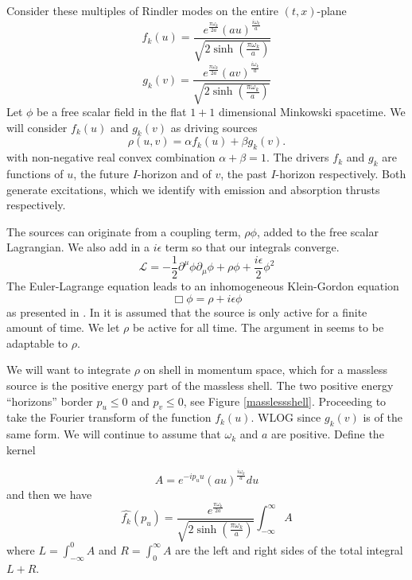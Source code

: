 \documentclass[12pt,a4paper]{article}
\begin{document}
Consider these multiples of Rindler modes on the entire $(t,x)$-plane
\begin{equation}
f_k(u) = \frac{e^{\frac{\pi \omega_k}{2a}} {(au)}^{\frac{i\omega_k}{a}}}{ \sqrt{2\sinh\left(\frac{\pi\omega_k}{a}\right)}}
\end{equation}
\begin{equation}
g_k(v) = \frac{e^{\frac{\pi \omega_k}{2a}} {(av)}^{\frac{i\omega_k}{a}}}{ \sqrt{2\sinh\left(\frac{\pi\omega_k}{a}\right)} }
\end{equation}
Let $\phi$ be a free scalar field in the flat $1+1$ dimensional Minkowski spacetime.  We will consider $f_k(u)$ and $g_k(v)$ as driving sources
\begin{equation}
\label{ab}
\rho(u,v) = \alpha f_k(u) + \beta g_k(v).
\end{equation}
with non-negative real convex combination $\alpha + \beta = 1$. The drivers $f_k$ and $g_k$ are functions of $u$, the future $I$-horizon and of $v$, the past $I$-horizon respectively.  Both generate excitations, which we identify with emission and absorption thrusts respectively.


The sources can originate from a coupling term, $\rho \phi$, added to the free scalar Lagrangian.  We also add in a $i \epsilon$ term so that our integrals converge.
\begin{equation}
\mathscr{L} = -\frac{1}{2} \partial^\mu \phi \partial_\mu \phi + \rho\phi + \frac{i \epsilon}{2}  \phi^2
\end{equation}
The Euler-Lagrange equation leads to an inhomogeneous Klein-Gordon equation
\begin{equation}
  \Box  \phi = \rho + i \epsilon \phi
\end{equation}
as presented in \cite{beisert}.  In \cite{beisert} it is assumed that the source is only active for a finite amount of time.  We let $\rho$ be active for all time.  The argument in \cite{beisert} seems to be adaptable to $\rho$.

We will want to integrate $\rho$ on shell in momentum space, which for a massless source is the positive energy part of the massless shell.  The two positive energy ``horizons'' border $p_u \le 0$ and $p_v \le 0$, see Figure \ref{masslessshell}.  Proceeding to take the Fourier transform of the function $f_k(u)$.  WLOG since $g_k(v)$ is of the same form.  We will continue to assume that $\omega_k$ and $a$ are positive. Define the kernel

\begin{equation}
  A = e^{-i p_u u} (au)^\frac{i\omega_k}{a} du
\end{equation}
and then we have
\begin{equation}
\label{finalnorm}
  \hat{f_k}(p_u) =  \frac{e^{\frac{\pi \omega_k}{2a}}}{\sqrt{2 \sinh \left({\frac{\pi\omega_k}{a}}\right)}}  \int_{-\infty}^\infty A
\end{equation}
where $L=\int_{-\infty}^0 A$ and $R=\int_0^\infty A$ are the left and right sides of the total integral $L + R$.
\end{document}
